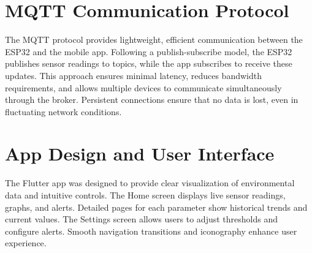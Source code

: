 \documentclass[../main]{subfiles}
\begin{document}
\section{MQTT Communication Protocol}

The MQTT protocol provides lightweight, efficient communication between the
ESP32 and the mobile app. Following a publish-subscribe model, the ESP32
publishes sensor readings to topics, while the app subscribes to receive these
updates. This approach ensures minimal latency, reduces bandwidth requirements,
and allows multiple devices to communicate simultaneously through the broker.
Persistent connections ensure that no data is lost, even in fluctuating network
conditions.

\section{App Design and User Interface}

The Flutter app was designed to provide clear visualization of environmental
data and intuitive controls. The Home screen displays live sensor readings,
graphs, and alerts. Detailed pages for each parameter show historical trends
and current values. The Settings screen allows users to adjust thresholds and
configure alerts. Smooth navigation transitions and iconography enhance user
experience.
\end{document}
